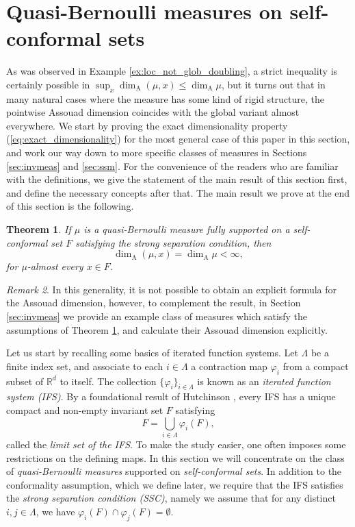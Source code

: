 \documentclass{PRM}
\newcommand{\field}[1]{\mathbb{#1}}
\newcommand{\R}{\field{R}}
\newcommand{\adim}{\dim_{\mathrm{A}}}
\theoremstyle{plain}
\newtheorem{thm}{Theorem}[section]
\theoremstyle{definition}
\theoremstyle{remark}
\newtheorem{huom}[thm]{Remark}
\begin{document}
\section{Quasi-Bernoulli measures on self-conformal sets}\label{sec:qb-meas}
As was observed in Example \ref{ex:loc_not_glob_doubling}, a strict inequality is certainly possible in $\sup_{x}\adim(\mu,x)\leq \adim\mu$, but it turns out that in many natural cases where the measure has some kind of rigid structure, the pointwise Assouad dimension coincides with the global variant almost everywhere. We start by proving the exact dimensionality property (\ref{eq:exact_dimensionality}) for the most general case of this paper in this section, and work our way down to more specific classes of measures in Sections \ref{sec:invmeas} and \ref{sec:ssm}. For the convenience of the readers who are familiar with the definitions, we give the statement of the main result of this section first, and define the necessary concepts after that. The main result we prove at the end of this section is the following.

\begin{thm}\label{thm:quasi-bernoulli-exact-assouad}
    If $\mu$ is a quasi-Bernoulli measure fully supported on a self-conformal set $F$ satisfying the strong separation condition, then
    \begin{equation*}
        \dim_{\mathrm{A}}(\mu,x)=\dim_{\mathrm{A}}\mu<\infty,
    \end{equation*}
    for $\mu$-almost every $x\in F$.
\end{thm}
\begin{huom}
    In this generality, it is not possible to obtain an explicit formula for the Assouad dimension, however, to complement the result, in Section \ref{sec:invmeas} we provide an example class of measures which satisfy the assumptions of Theorem \ref{thm:quasi-bernoulli-exact-assouad}, and calculate their Assouad dimension explicitly.
\end{huom}

Let us start by recalling some basics of iterated function systems. Let $\Lambda$ be a finite index set, and associate to each $i\in\Lambda$ a contraction map $\varphi_i$ from a compact subset of $\R^d$ to itself. The collection $\{\varphi_i\}_{i\in\Lambda}$ is known as an \emph{iterated function system (IFS)}. By a foundational result of Hutchinson \cite{H}, every IFS has a unique compact and non-empty invariant set $F$ satisfying
\begin{equation*}
    F=\bigcup_{i\in\Lambda}\varphi_i(F),
\end{equation*}
called the \emph{limit set of the IFS}. To make the study easier, one often imposes some restrictions on the defining maps. In this section we will concentrate on the class of \emph{quasi-Bernoulli measures} supported on \emph{self-conformal sets}. In addition to the conformality assumption, which we define later, we require that the IFS satisfies the \emph{strong separation condition (SSC)}, namely we assume that for any distinct $i,j\in\Lambda$, we have $\varphi_i(F)\cap \varphi_j(F)=\emptyset$.
\end{document}
